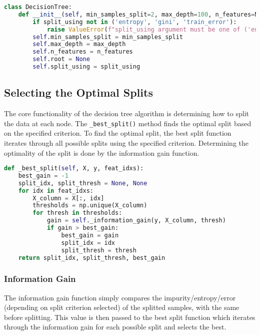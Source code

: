 \documentclass{article}
\begin{document}
\begin{lstlisting}[language=Python, caption=DecisionTree Class Initialization]
class DecisionTree:
    def __init__(self, min_samples_split=2, max_depth=100, n_features=None, split_using="entropy"):
        if split_using not in ('entropy', 'gini', 'train_error'):
            raise ValueError(f"split_using argument must be one of ('entropy', 'gini', 'train_error')")
        self.min_samples_split = min_samples_split
        self.max_depth = max_depth
        self.n_features = n_features
        self.root = None
        self.split_using = split_using
\end{lstlisting}

\subsection{Selecting the Optimal Splits}
The core functionality of the decision tree algorithm is determining how to split the data at each node. The \texttt{\_best\_split()} method finds the optimal split based on the specified criterion. To find the optimal split, the best split function iterates through all possible splits using the specified criterion. Determining the optimality of the split is done by the information gain function. 

\begin{lstlisting}[language=Python, caption=Selecting the best split]
def _best_split(self, X, y, feat_idxs):
    best_gain = -1
    split_idx, split_thresh = None, None
    for idx in feat_idxs:
        X_column = X[:, idx]
        thresholds = np.unique(X_column)
        for thresh in thresholds:
            gain = self._information_gain(y, X_column, thresh)
            if gain > best_gain:
                best_gain = gain
                split_idx = idx
                split_thresh = thresh
    return split_idx, split_thresh, best_gain
\end{lstlisting}

\subsubsection{Information Gain}
The information gain function simply compares the impurity/entropy/error (depending on split criterion selected) of the splitted samples, with the same before splitting. This value is then passed to the best split function which iterates through the information gain for each possible split and selects the best.
\end{document}
